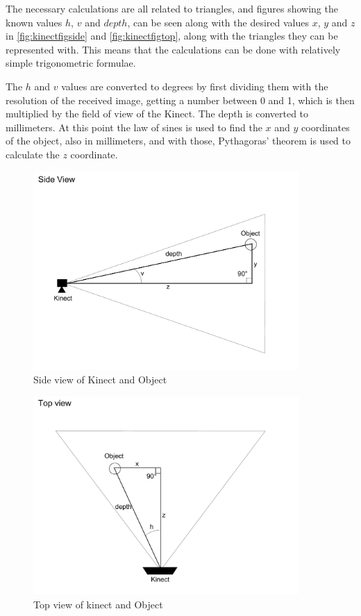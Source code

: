 The necessary calculations are all related to triangles, and figures showing the known values $h$, $v$ and $depth$,
can be seen along with the desired values $x$, $y$ and $z$ in \autoref{fig:kinectfigside} and \autoref{fig:kinectfigtop},
along with the triangles they can be represented with. This means that the calculations can be done with relatively
simple trigonometric formulae.

The $h$ and $v$ values are converted to degrees by first dividing them with the resolution of the received image, getting
a number between 0 and 1, which is then multiplied by the field of view of the Kinect. The depth is converted to
millimeters. At this point the law of sines is used to find the $x$ and $y$ coordinates of the object, also in
millimeters, and with those, Pythagoras' theorem is used to calculate the $z$ coordinate.

\begin{figure}[hbtp]
\includegraphics[width=0.90\textwidth]{img/kinectfigside.pdf}
\caption{Side view of Kinect and Object} 
\label{fig:kinectfigside} 
\end{figure}

\begin{figure}[hbtp]
\includegraphics[width=0.90\textwidth]{img/kinectfigtop.pdf}
\caption{Top view of kinect and Object} 
\label{fig:kinectfigtop} 
\end{figure}

